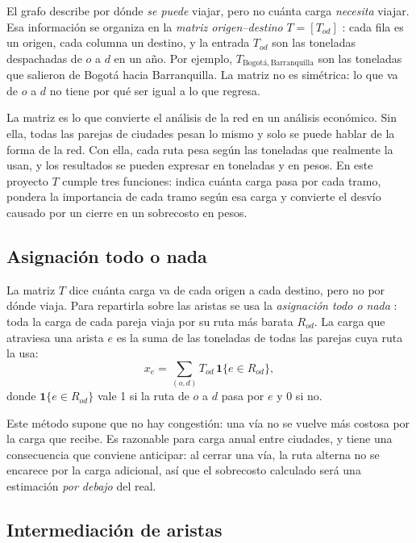 \documentclass[conference]{IEEEtran}
\begin{document}
El grafo describe por dónde \emph{se puede} viajar, pero no cuánta carga
\emph{necesita} viajar. Esa información se organiza en la \emph{matriz
origen--destino} $T=[T_{od}]$ \cite{ortuzar2011}: cada fila es un origen, cada
columna un destino, y la entrada $T_{od}$ son las toneladas despachadas de $o$
a $d$ en un año. Por ejemplo, $T_{\text{Bogotá},\,\text{Barranquilla}}$ son las
toneladas que salieron de Bogotá hacia Barranquilla. La matriz no es simétrica:
lo que va de $o$ a $d$ no tiene por qué ser igual a lo que regresa.

La matriz es lo que convierte el análisis de la red en un análisis económico.
Sin ella, todas las parejas de ciudades pesan lo mismo y solo se puede hablar
de la forma de la red. Con ella, cada ruta pesa según las toneladas que
realmente la usan, y los resultados se pueden expresar en toneladas y en pesos.
En este proyecto $T$ cumple tres funciones: indica cuánta carga pasa por cada
tramo, pondera la importancia de cada tramo según esa carga y convierte el
desvío causado por un cierre en un sobrecosto en pesos.

\subsection{Asignación todo o nada}
\label{sub:asignacion}

La matriz $T$ dice cuánta carga va de cada origen a cada destino, pero no por
dónde viaja. Para repartirla sobre las aristas se usa la \emph{asignación todo
o nada} \cite{ortuzar2011}: toda la carga de cada pareja viaja por su ruta más
barata $R_{od}$. La carga que atraviesa una arista $e$ es la suma de las
toneladas de todas las parejas cuya ruta la usa:
\begin{equation}\label{eq:flujo}
x_e=\sum_{(o,d)} T_{od}\,\mathbf{1}\{e\in R_{od}\},
\end{equation}
donde $\mathbf{1}\{e\in R_{od}\}$ vale 1 si la ruta de $o$ a $d$ pasa por $e$ y
0 si no.

Este método supone que no hay congestión: una vía no se vuelve más costosa por
la carga que recibe. Es razonable para carga anual entre ciudades, y tiene una
consecuencia que conviene anticipar: al cerrar una vía, la ruta alterna no se
encarece por la carga adicional, así que el sobrecosto calculado será una
estimación \emph{por debajo} del real.

\subsection{Intermediación de aristas}
\label{sub:btw}
\end{document}
